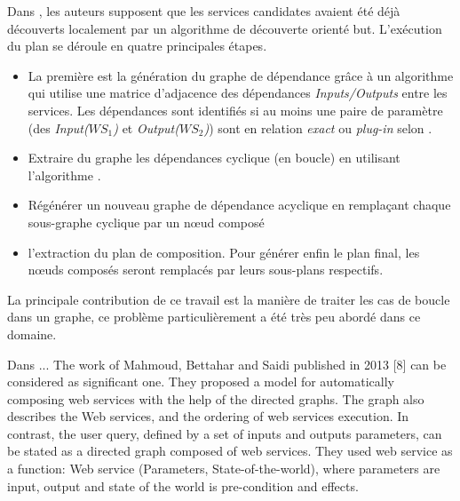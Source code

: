   \begin{text}
    Dans \cite{omer2009dependency}, les auteurs supposent que les
    services candidates avaient été déjà découverts localement par un
    algorithme de découverte orienté but. L'exécution du plan se
    déroule en quatre principales étapes.

    \SpecialItem
    \begin{itemize}
    \item La première est la génération du graphe de dépendance grâce
      à un algorithme qui utilise une matrice d'adjacence des
      dépendances \textit{Inputs/Outputs} entre les services. Les
      dépendances sont identifiés si au moins une paire de paramètre
      (des \textit{Input($WS_1$)} et \textit{Output($WS_2$)}) sont en
      relation \textit{exact} ou \textit{plug-in} selon
      \cite{paolucci2002semantic}.

    \item Extraire du graphe les dépendances cyclique (en boucle) en
      utilisant l'algorithme \cite{tarjan1973enumeration}.

    \item Régénérer un nouveau graphe de dépendance acyclique en
      remplaçant chaque sous-graphe cyclique par un nœud composé

    \item l'extraction du plan de composition. Pour générer enfin le
      plan final, les nœuds composés seront remplacés par leurs
      sous-plans respectifs.
    \end{itemize}

    La principale contribution de ce travail est la manière de traiter
    les cas de boucle dans un graphe, ce problème particulièrement a été
    très peu abordé dans ce domaine.
  \end{text}

  \begin{text}
    Dans \cite{mahmoud2013towards} ... %
    The work of Mahmoud, Bettahar and Saidi published in 2013 [8] can
    be considered as significant one. They proposed a model for
    automatically composing web services with the help of the directed
    graphs. The graph also describes the Web services, and the
    ordering of web services execution. In contrast, the user query,
    defined by a set of inputs and outputs parameters, can be stated
    as a directed graph composed of web services. They used web
    service as a function: Web service (Parameters,
    State-of-the-world), where parameters are input, output and state
    of the world is pre-condition and effects.
  \end{text}

